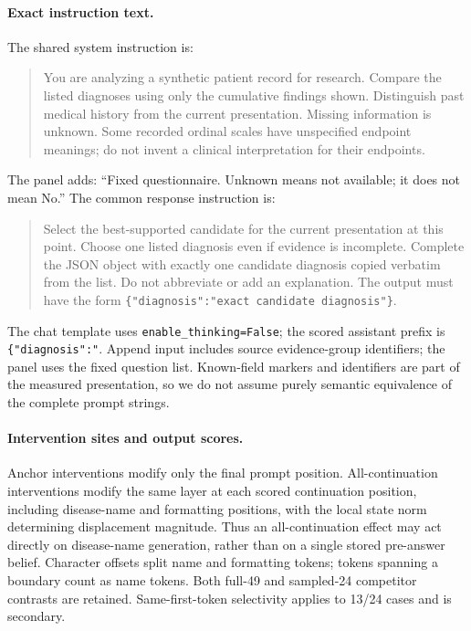 \paragraph{Exact instruction text.} The shared system instruction is:
\begin{quote}\small
You are analyzing a synthetic patient record for research. Compare the listed diagnoses using only the cumulative findings shown. Distinguish past medical history from the current presentation. Missing information is unknown. Some recorded ordinal scales have unspecified endpoint meanings; do not invent a clinical interpretation for their endpoints.
\end{quote}
The panel adds: ``Fixed questionnaire. Unknown means not available; it does not mean No.'' The common response instruction is:
\begin{quote}\small
Select the best-supported candidate for the current presentation at this point. Choose one listed diagnosis even if evidence is incomplete. Complete the JSON object with exactly one candidate diagnosis copied verbatim from the list. Do not abbreviate or add an explanation. The output must have the form \texttt{\{"diagnosis":"exact candidate diagnosis"\}}.
\end{quote}
The chat template uses \texttt{enable\_thinking=False}; the scored assistant prefix is \texttt{\{"diagnosis":"}. Append input includes source evidence-group identifiers; the panel uses the fixed question list. Known-field markers and identifiers are part of the measured presentation, so we do not assume purely semantic equivalence of the complete prompt strings.

\paragraph{Intervention sites and output scores.} Anchor interventions modify only the final prompt position. All-continuation interventions modify the same layer at each scored continuation position, including disease-name and formatting positions, with the local state norm determining displacement magnitude. Thus an all-continuation effect may act directly on disease-name generation, rather than on a single stored pre-answer belief. Character offsets split name and formatting tokens; tokens spanning a boundary count as name tokens. Both full-49 and sampled-24 competitor contrasts are retained. Same-first-token selectivity applies to 13/24 cases and is secondary.

